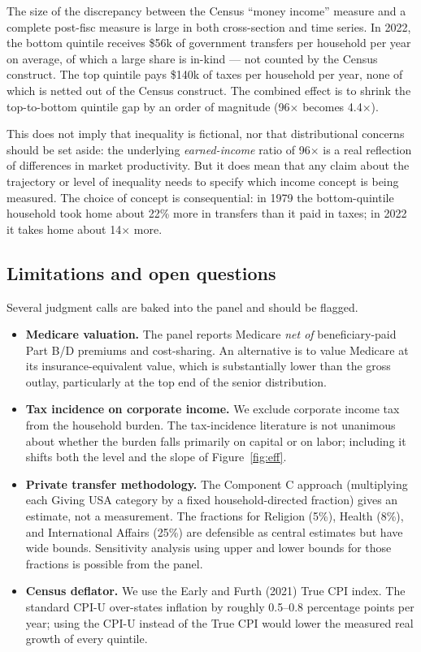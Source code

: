 \documentclass[11pt,letterpaper]{article}
\begin{document}
The size of the discrepancy between the Census ``money income'' measure and
a complete post-fisc measure is large in both cross-section and time series.
In 2022, the bottom quintile receives \$56k of government transfers per
household per year on average, of which a large share is in-kind --- not
counted by the Census construct. The top quintile pays \$140k of taxes per
household per year, none of which is netted out of the Census construct.
The combined effect is to shrink the top-to-bottom quintile gap by an order
of magnitude (96$\times$ becomes 4.4$\times$).

This does not imply that inequality is fictional, nor that distributional
concerns should be set aside: the underlying \emph{earned-income} ratio of
96$\times$ is a real reflection of differences in market productivity. But
it does mean that any claim about the trajectory or level of inequality
needs to specify which income concept is being measured. The choice of
concept is consequential: in 1979 the bottom-quintile household took home
about 22\% more in transfers than it paid in taxes; in 2022 it takes home
about 14$\times$ more.

\subsection{Limitations and open questions}

Several judgment calls are baked into the panel and should be flagged.

\begin{itemize}[leftmargin=*]
  \item \textbf{Medicare valuation.} The panel reports Medicare \emph{net of}
        beneficiary-paid Part B/D premiums and cost-sharing. An alternative
        is to value Medicare at its insurance-equivalent value, which is
        substantially lower than the gross outlay, particularly at the top
        end of the senior distribution.
  \item \textbf{Tax incidence on corporate income.} We exclude corporate
        income tax from the household burden. The tax-incidence literature is
        not unanimous about whether the burden falls primarily on capital or
        on labor; including it shifts both the level and the slope of
        Figure~\ref{fig:eff}.
  \item \textbf{Private transfer methodology.} The Component C approach
        (multiplying each Giving USA category by a fixed household-directed
        fraction) gives an estimate, not a measurement. The fractions for
        Religion (5\%), Health (8\%), and International Affairs (25\%) are
        defensible as central estimates but have wide bounds. Sensitivity
        analysis using upper and lower bounds for those fractions is
        possible from the panel.
  \item \textbf{Census deflator.} We use the Early and Furth (2021) True CPI
        index. The standard CPI-U over-states inflation by roughly 0.5--0.8
        percentage points per year; using the CPI-U instead of the True CPI
        would lower the measured real growth of every quintile.
\end{itemize}
\end{document}
